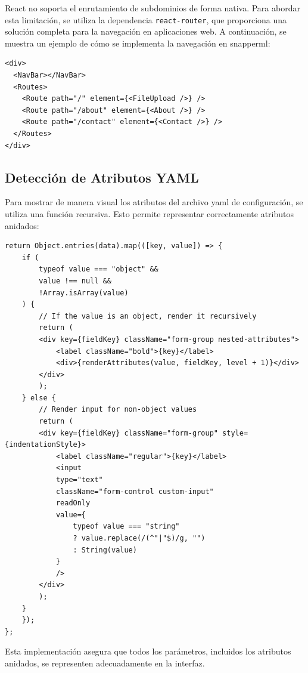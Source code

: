 React no soporta el enrutamiento de subdominios de forma nativa. Para abordar esta limitación, se utiliza la dependencia \texttt{react-router}, que proporciona una solución completa para la navegación en aplicaciones web. A continuación, se muestra un ejemplo de cómo se implementa la navegación en \Gls{snapperml}:

\begin{verbatim}
<div>
  <NavBar></NavBar>
  <Routes>
    <Route path="/" element={<FileUpload />} />
    <Route path="/about" element={<About />} />
    <Route path="/contact" element={<Contact />} />
  </Routes>
</div>
\end{verbatim}

\subsection{Detección de Atributos YAML}

Para mostrar de manera visual los atributos del archivo \acrshort{yaml} de configuración, se utiliza una función recursiva. Esto permite representar correctamente atributos anidados:

\begin{verbatim} 
return Object.entries(data).map(([key, value]) => {
    if (
        typeof value === "object" &&
        value !== null &&
        !Array.isArray(value)
    ) {
        // If the value is an object, render it recursively
        return (
        <div key={fieldKey} className="form-group nested-attributes">
            <label className="bold">{key}</label>
            <div>{renderAttributes(value, fieldKey, level + 1)}</div>
        </div>
        );
    } else {
        // Render input for non-object values
        return (
        <div key={fieldKey} className="form-group" style={indentationStyle}>
            <label className="regular">{key}</label>
            <input
            type="text"
            className="form-control custom-input"
            readOnly
            value={
                typeof value === "string"
                ? value.replace(/(^"|"$)/g, "")
                : String(value)
            }
            />
        </div>
        );
    }
    });
};
\end{verbatim}

Esta implementación asegura que todos los parámetros, incluidos los atributos anidados, se representen adecuadamente en la interfaz.

